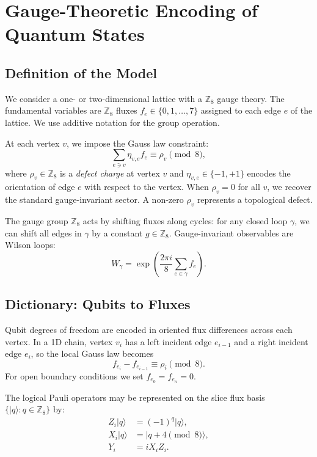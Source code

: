 \section{Gauge-Theoretic Encoding of Quantum States}
\label{sec:gauge-construction}

\subsection{Definition of the Model}

We consider a one- or two-dimensional lattice with a $\mathbb{Z}_8$ gauge theory. The fundamental variables are $\mathbb{Z}_8$ fluxes $f_e \in \{0,1,\dots,7\}$ assigned to each edge $e$ of the lattice. We use additive notation for the group operation.

At each vertex $v$, we impose the Gauss law constraint:
\begin{equation}
\sum_{e \ni v} \eta_{v,e} f_e \equiv \rho_v \pmod{8},
\end{equation}
where $\rho_v \in \mathbb{Z}_8$ is a \textit{defect charge} at vertex $v$ and $\eta_{v,e} \in \{-1,+1\}$ encodes the orientation of edge $e$ with respect to the vertex. When $\rho_v = 0$ for all $v$, we recover the standard gauge-invariant sector. A non-zero $\rho_v$ represents a topological defect.

The gauge group $\mathbb{Z}_8$ acts by shifting fluxes along cycles: for any closed loop $\gamma$, we can shift all edges in $\gamma$ by a constant $g \in \mathbb{Z}_8$. Gauge-invariant observables are Wilson loops:
\begin{equation}
W_\gamma = \exp\left(\frac{2\pi i}{8} \sum_{e \in \gamma} f_e\right).
\end{equation}

\subsection{Dictionary: Qubits to Fluxes}

Qubit degrees of freedom are encoded in oriented flux differences across each vertex. In a 1D chain, vertex $v_i$ has a left incident edge $e_{i-1}$ and a right incident edge $e_i$, so the local Gauss law becomes
\begin{equation}
f_{e_i} - f_{e_{i-1}} \equiv \rho_i \pmod{8}.
\end{equation}
For open boundary conditions we set $f_{e_0} = f_{e_n} = 0$.

The logical Pauli operators may be represented on the slice flux basis $\{|q\rangle : q \in \mathbb{Z}_8\}$ by:
\begin{align}
Z_i |q\rangle &= (-1)^q |q\rangle, \\
X_i |q\rangle &= |q + 4 \pmod{8}\rangle, \\
Y_i &= i X_i Z_i.
\end{align}

